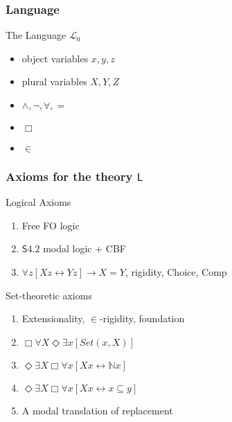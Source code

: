\documentclass[handout]{beamer}
\begin{document}
\begin{frame}
    \frametitle{Language}
    \begin{block}{The Language $\mathcal{L}_0$}
        \begin{itemize}
            \item object variables $x, y, z$
            \item<2-> plural variables $X, Y, Z$
            \item<3-> $\wedge, \neg, \forall, =$
            \item<4-> $\Box$
            \item<5-> $\in$
        \end{itemize} 
    \end{block}
\end{frame}

\begin{frame}
    \frametitle{Axioms for the theory $\mathsf{L}$}
    \begin{block}{Logical Axioms}
    \begin{enumerate}
        \item<2-> Free FO logic
        \item<3-> $\mathsf{S4.2}$ modal logic + CBF
        \item<4-> $\forall z[Xz \leftrightarrow Yz] \rightarrow X = Y$, rigidity,
        Choice, Comp
    \end{enumerate}
    \end{block}
    \begin{block}{Set-theoretic axioms}
        \begin{enumerate}
        \item<6-> Extensionality, $\in$-rigidity, foundation
        \item<7-> $\Box \forall X \Diamond \exists x [Set(x, X)]$
        \item<8-> $\Diamond \exists X \Box \forall x[Xx \leftrightarrow \mathbb{N}x]$
        \item<9-> $\Diamond \exists X \Box \forall x[Xx \leftrightarrow x \subseteq y]$
        \item<10-> A modal translation of replacement
        \end{enumerate}
    \end{block}
\end{frame}
\end{document}
